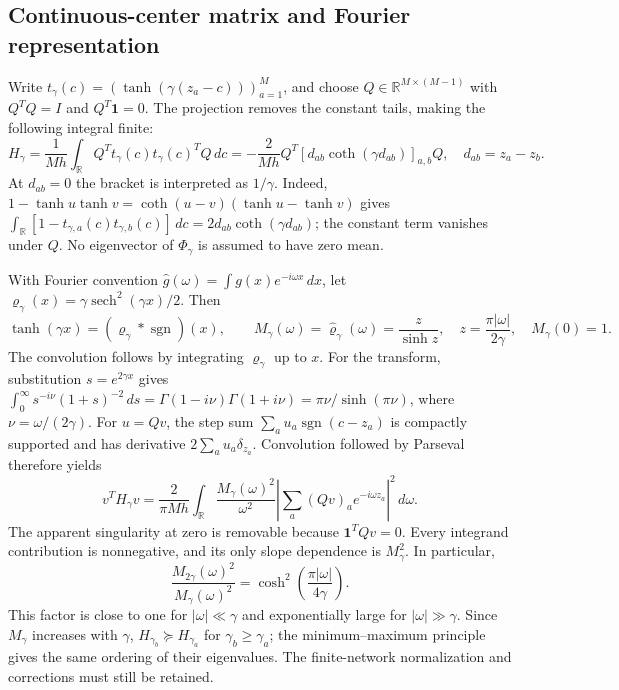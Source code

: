 \subsection{Continuous-center matrix and Fourier representation}
Write $t_\gamma(c)=(\tanh(\gamma(z_a-c)))_{a=1}^M$, and choose
$Q\in\mathbb R^{M\times(M-1)}$ with $Q^TQ=I$ and $Q^T\mathbf1=0$.
The projection removes the constant tails, making the following integral finite:
\begin{equation}
 H_\gamma=\frac1{Mh}\int_{\mathbb R}
 Q^Tt_\gamma(c)t_\gamma(c)^TQ\,dc
 =-\frac2{Mh}Q^T[d_{ab}\coth(\gamma d_{ab})]_{a,b}Q,
 \quad d_{ab}=z_a-z_b.
 \label{eq:note-integral-matrix}
\end{equation}
At $d_{ab}=0$ the bracket is interpreted as $1/\gamma$.
Indeed, $1-\tanh u\tanh v=\coth(u-v)(\tanh u-\tanh v)$ gives
$\int_{\mathbb R}[1-t_{\gamma,a}(c)t_{\gamma,b}(c)]\,dc
=2d_{ab}\coth(\gamma d_{ab})$; the constant term vanishes under $Q$.
No eigenvector of $\Phi_\gamma$ is assumed to have zero mean.

With Fourier convention $\widehat g(\omega)=\int g(x)e^{-i\omega x}\,dx$,
let $\varrho_\gamma(x)=\gamma\operatorname{sech}^2(\gamma x)/2$. Then
\begin{equation}
 \tanh(\gamma x)=(\varrho_\gamma*\operatorname{sgn})(x),\qquad
 M_\gamma(\omega)=\widehat\varrho_\gamma(\omega)
 =\frac{z}{\sinh z},\quad z=\frac{\pi|\omega|}{2\gamma},\quad M_\gamma(0)=1.
 \label{eq:note-multiplier}
\end{equation}
The convolution follows by integrating $\varrho_\gamma$ up to $x$.
For the transform, substitution $s=e^{2\gamma x}$ gives
$\int_0^\infty s^{-i\nu}(1+s)^{-2}\,ds
=\Gamma(1-i\nu)\Gamma(1+i\nu)=\pi\nu/\sinh(\pi\nu)$,
where $\nu=\omega/(2\gamma)$.
For $u=Qv$, the step sum $\sum_a u_a\operatorname{sgn}(c-z_a)$ is
compactly supported and has derivative $2\sum_a u_a\delta_{z_a}$.
Convolution followed by Parseval therefore yields
\begin{equation}
 v^TH_\gamma v=\frac2{\pi Mh}\int_{\mathbb R}
 \frac{M_\gamma(\omega)^2}{\omega^2}
 \left|\sum_a(Qv)_a e^{-i\omega z_a}\right|^2\,d\omega.
 \label{eq:note-fourier-quadratic}
\end{equation}
The apparent singularity at zero is removable because $\mathbf1^TQv=0$.
Every integrand contribution is nonnegative, and its only slope dependence
is $M_\gamma^2$. In particular,
\begin{equation}
 \frac{M_{2\gamma}(\omega)^2}{M_\gamma(\omega)^2}
 =\cosh^2\!\left(\frac{\pi|\omega|}{4\gamma}\right).
 \label{eq:note-multiplier-gain}
\end{equation}
This factor is close to one for $|\omega|\ll\gamma$ and exponentially
large for $|\omega|\gg\gamma$. Since $M_\gamma$ increases with $\gamma$,
$H_{\gamma_b}\succeq H_{\gamma_a}$ for $\gamma_b\ge\gamma_a$;
the minimum--maximum principle gives the same ordering of their eigenvalues.
The finite-network normalization and corrections must still be retained.

